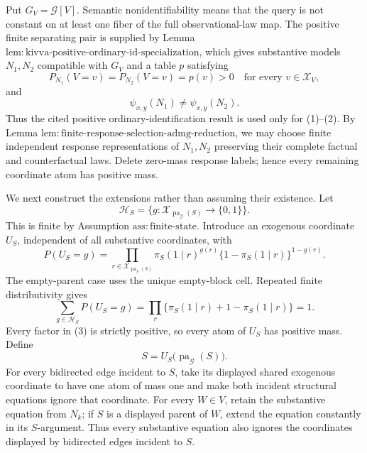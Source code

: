 Put \(G_V=\mathcal G[V]\). Semantic nonidentifiability means that the query is not constant on at least one fiber of the full observational-law map. The positive finite separating pair is supplied by Lemma \(\mathrm{lem{:}kivva\text{-}positive\text{-}ordinary\text{-}id\text{-}specialization}\), which gives substantive models \(N_1,N_2\) compatible with \(G_V\) and a table \(p\) satisfying
\[
 P_{N_1}(V=v)=P_{N_2}(V=v)=p(v)>0
 \quad\text{for every }v\in\mathcal X_V,
 \tag{1}
\]
and
\[
 \psi_{x,y}(N_1)\ne\psi_{x,y}(N_2).
 \tag{2}
\]
Thus the cited positive ordinary-identification result is used only for (1)--(2). By Lemma \(\mathrm{lem{:}finite\text{-}response\text{-}selection\text{-}admg\text{-}reduction}\), we may choose finite independent response representations of \(N_1,N_2\) preserving their complete factual and counterfactual laws. Delete zero-mass response labels; hence every remaining coordinate atom has positive mass.

We next construct the extensions rather than assuming their existence. Let
\[
 \mathcal H_S
 =\bigl\{g:\mathcal X_{\operatorname{pa}_{\mathcal G}(S)}\longrightarrow\{0,1\}\bigr\}.
\]
This is finite by Assumption \(\mathrm{ass{:}finite\text{-}state}\). Introduce an exogenous coordinate \(U_S\), independent of all substantive coordinates, with
\[
 P(U_S=g)
 =\prod_{r\in\mathcal X_{\operatorname{pa}_{\mathcal G}(S)}}
 \pi_S(1\mid r)^{g(r)}
 \{1-\pi_S(1\mid r)\}^{1-g(r)}.
 \tag{3}
\]
The empty-parent case uses the unique empty-block cell. Repeated finite distributivity gives
\[
 \sum_{g\in\mathcal H_S}P(U_S=g)
 =\prod_r\{\pi_S(1\mid r)+1-\pi_S(1\mid r)\}=1.
\]
Every factor in (3) is strictly positive, so every atom of \(U_S\) has positive mass. Define
\[
 S=U_S\bigl(\operatorname{pa}_{\mathcal G}(S)\bigr).
 \tag{4}
\]
For every bidirected edge incident to \(S\), take its displayed shared exogenous coordinate to have one atom of mass one and make both incident structural equations ignore that coordinate. For every \(W\in V\), retain the substantive equation from \(N_k\); if \(S\) is a displayed parent of \(W\), extend the equation constantly in its \(S\)-argument. Thus every substantive equation also ignores the coordinates displayed by bidirected edges incident to \(S\).

